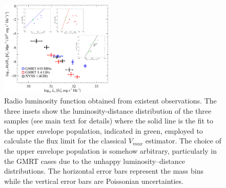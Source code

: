 \documentclass[traditabstract]{aa}
\begin{document}
\begin{appendix}
\begin{figure}[hbt!]
\centering
\includegraphics[width=0.48\textwidth]{figures/RLF_observations.eps}
\caption{Radio luminosity function obtained from existent observations. The three insets show the luminosity-distance distribution of the three samples (see main text for details) where the solid line is the fit to the upper envelope population, indicated in green, employed to calculate the flux limit for the classical $V_{max}$ estimator. The choice of the upper envelope population is somehow arbitrary, particularly in the GMRT cases due to the unhappy luminosity--distance distributions. The horizontal error bars represent the mass bins while the vertical error bars are Poissonian uncertainties.}
\label{fig:RLFobs}
\end{figure}

\end{appendix}





\end{document}
